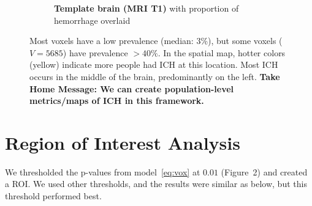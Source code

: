\documentclass[final]{beamer}\usepackage[]{graphicx}\usepackage[]{color}
\begin{document}
\begin{frame}[fragile]
\begin{multicols}{2}
\begin{figure}[htbp]
\begin{subfigure}[t]{.4\linewidth}
   \caption{\textbf{Template brain (MRI T1)} with proportion of hemorrhage overlaid}
  \label{prop:img}
  \end{subfigure}
      \caption{Most voxels have a low prevalence (median: $3$\%), but some voxels ($V = 5685$) have prevalence $>40\%$.  In the spatial map, hotter colors (yellow) indicate more people had ICH at this location. Most ICH occurs in the middle of the brain, predominantly on the left.   {\bf Take Home Message: We can create population-level metrics/maps of ICH in this framework. }
  }
  \label{fig:StrokeHist}
    \hfill
\end{figure}

\vspace*{-3cm}


\section{Region of Interest Analysis}


We thresholded the p-values from model~\eqref{eq:vox} at $0.01$ (Figure~2) and created a ROI.  We used other thresholds, and the results were similar as below, but this threshold performed best.


\end{multicols}
\end{frame}
\end{document}
